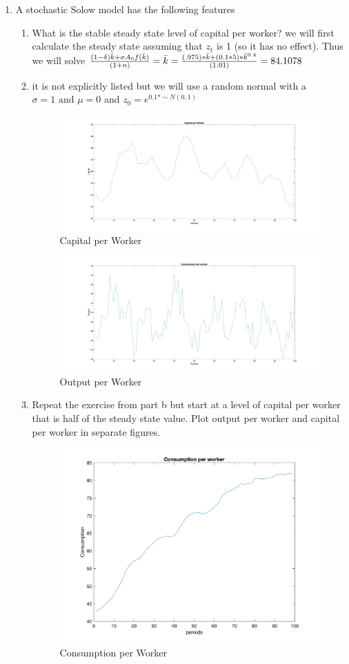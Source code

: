 \documentclass[12pt,oneside,reqno]{amsart}
\begin{document}
\begin{enumerate}
\begin{figure}[H]
    \end{figure}
\item A stochastic Solow model has the following features
\begin{enumerate}
    \item What is the stable steady state level of capital per worker?
    we will first  calculate the steady state assuming that $z_{t}$ is 1 (so it has no effect). Thus we will solve $\frac{(1-\delta)\Bar{k}+\sigma A_0 f(\Bar{k})}{(1+n)} = \Bar{k} = \frac{(.975)*\Bar{k}+(0.1*5)*\Bar{k}^{0.4}}{(1.01)}= 84.1078$
    \item it is not explicitly listed but we will use a random normal with a $\sigma =1 \text{ and } \mu =0$ and $z_0 =e^{0.1*\sim N(0,1)}$
    
    \begin{figure}[H]
        \centering
        \includegraphics[width =.5\linewidth]{HW1/pics/HW1_Q3_b1.png}
        \caption{Capital per Worker}
    \end{figure}
    
    \begin{figure}[H]
        \centering
        \includegraphics[width =.5\linewidth]{HW1/pics/HW1_Q3_b2.png}
        \caption{Output per Worker}
    \end{figure}
    \item Repeat the exercise from part b but start at a level of capital per worker that is half of the steady state value. Plot output per worker and capital per worker in separate figures.
    \begin{figure}[H]
        \centering
        \includegraphics[width =.5\linewidth]{HW1/pics/HW1_Q3_c1.png}
        \caption{Consumption per Worker}
    \end{figure}
    

\end{enumerate}
\end{enumerate}
\end{document}
